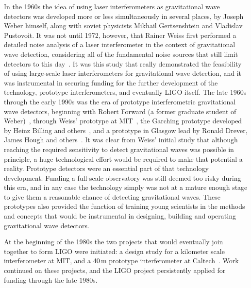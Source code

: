 In the 1960s the idea of using laser interferometers as gravitational wave detectors was developed more or less simultaneously 
in several places, by Joseph Weber himself, along with soviet physicists Mikhail Gertsenshtein and Vladislav Pustovoit. 
It was not until 1972, however, that Rainer Weiss first performed a detailed noise analysis of a laser interferometer in the context 
of gravitational wave detection, considering all of the fundamental noise sources that still limit detectors to this day~\cite{Weiss1972}. 
It was this study that really demonstrated the feasibility of using large-scale laser interferometers for gravitational wave detection, and 
it was instrumental in securing funding for the further development of the technology, prototype interferometers, and eventually LIGO itself. 
The late 1960s through the early 1990s was the era of prototype interferometric gravitational wave detectors, beginning with 
Robert Forward (a former graduate student of Weber)~\cite{Forward_1978}, through Weiss' prototype at MIT~\cite{Dewey_1984}, the Garching prototype developed by 
Heinz Billing and others~\cite{Shoemaker1988}, and a prototype in Glasgow lead by Ronald Drever, James Hough and others~\cite{Robertson_1995}. 
It was clear from Weiss' initial study that although reaching the required sensitivity to detect gravitational waves 
was possible in principle, a huge technological effort would 
be required to make that potential a reality. 
Prototype detectors were an essential part of that technology development. Funding a full-scale 
observatory was still deemed too risky during this era, and in any case the technology simply was not at a mature enough stage to give them 
a reasonable chance of detecting gravitational waves. These prototypes also provided the function 
of training young scientists in the methods and concepts that would be instrumental in 
designing, building and operating gravitational wave detectors. 

At the beginning of the 1980s the two projects that would eventually join together to form LIGO were initiated: 
a design study for a kilometer scale interferometer at MIT, and a 40\,m 
prototype interferometer at Caltech~\cite{Spero_1989}. Work continued on these projects, and the LIGO project persistently applied for funding through the late 1980s.

